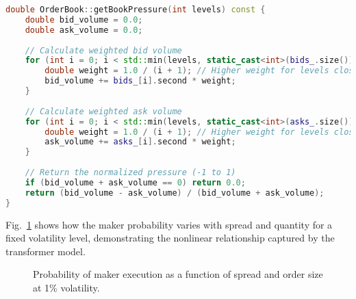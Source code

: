 \documentclass[10pt,twocolumn,a4paper]{IEEEtran}
\begin{document}
\begin{lstlisting}[language=C++, caption=Book Pressure Calculation]
double OrderBook::getBookPressure(int levels) const {
    double bid_volume = 0.0;
    double ask_volume = 0.0;
    
    // Calculate weighted bid volume
    for (int i = 0; i < std::min(levels, static_cast<int>(bids_.size())); ++i) {
        double weight = 1.0 / (i + 1); // Higher weight for levels closer to the mid
        bid_volume += bids_[i].second * weight;
    }
    
    // Calculate weighted ask volume
    for (int i = 0; i < std::min(levels, static_cast<int>(asks_.size())); ++i) {
        double weight = 1.0 / (i + 1); // Higher weight for levels closer to the mid
        ask_volume += asks_[i].second * weight;
    }
    
    // Return the normalized pressure (-1 to 1)
    if (bid_volume + ask_volume == 0) return 0.0;
    return (bid_volume - ask_volume) / (bid_volume + ask_volume);
}
\end{lstlisting}

Fig.~\ref{fig:maker_taker_prob} shows how the maker probability varies with spread and quantity for a fixed volatility level, demonstrating the nonlinear relationship captured by the transformer model.

\begin{figure}[t]
    \centering
    \caption{Probability of maker execution as a function of spread and order size at 1\% volatility.}
    \label{fig:maker_taker_prob}
\end{figure}
\end{document}
